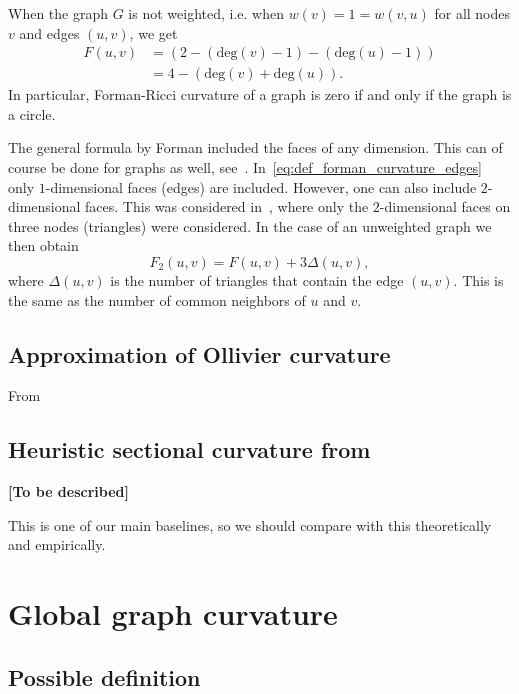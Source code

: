 \documentclass{article}
\begin{document}
When the graph $G$ is not weighted, i.e. when $w(v) = 1 = w(v,u)$ for all nodes $v$ and edges $(u,v)$, we get
\begin{align*}
	F(u,v) &= \left(2 - (\mathrm{deg}(v) - 1) - (\mathrm{deg}(u) - 1)\right) \\
	&= 4 - (\mathrm{deg}(v) + \mathrm{deg}(u)).
\end{align*}
In particular, Forman-Ricci curvature of a graph is zero if and only if the graph is a circle.

The general formula by Forman included the faces of any dimension. This can of course be done for graphs as well, see~\cite{weber2017coarse}. In~\eqref{eq:def_forman_curvature_edges} only $1$-dimensional faces (edges) are included. However, one can also include $2$-dimensional faces. This was considered in~\cite{samal2018comparative}, where only the $2$-dimensional faces on three nodes (triangles) were considered. In the case of an unweighted graph we then obtain
\begin{equation}\label{eq:def_forman_curvature_triangles}
	F_2(u,v) = F(u,v) + 3\Delta(u,v),
\end{equation}
where $\Delta(u,v)$ is the number of triangles that contain the edge $(u,v)$. This is the same as the number of common neighbors of $u$ and $v$. 

\subsection{Approximation of Ollivier curvature}

From~\cite{kelly2019self}

\subsection{Heuristic sectional curvature from~\cite{gu2019learning}}

\textbf{[To be described]}

This is one of our main baselines, so we should compare with this theoretically and empirically.


\section{Global graph curvature}

\subsection{Possible definition}
        
\end{document}

